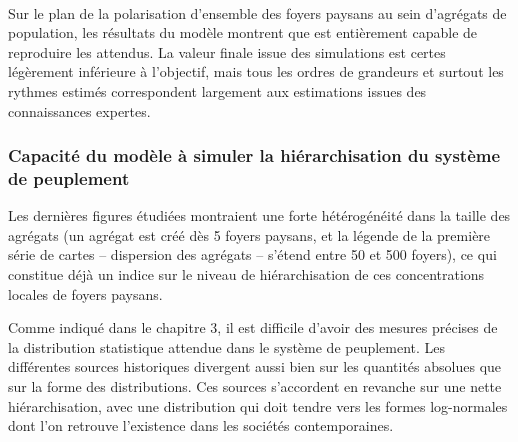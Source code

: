 \bigskip
\paragraph[Conclusion intermédiaire]{}
Sur le plan de la polarisation d'ensemble des foyers paysans au sein d'agrégats de population, les résultats du modèle montrent que \simfeodal{} est entièrement capable de reproduire les attendus.
La valeur finale issue des simulations est certes légèrement inférieure à l'objectif, mais tous les ordres de grandeurs et surtout les rythmes estimés correspondent largement aux estimations issues des connaissances expertes.

\subsubsection{Capacité du modèle à simuler la hiérarchisation du système de peuplement}

Les dernières figures étudiées montraient une forte hétérogénéité dans la taille des agrégats (un agrégat est créé dès 5 foyers paysans, et la légende de la première série de cartes -- dispersion des agrégats -- s'étend entre 50 et 500 foyers), ce qui constitue déjà un indice sur le niveau de hiérarchisation de ces concentrations locales de foyers paysans.

Comme indiqué dans le chapitre 3, il est difficile d'avoir des mesures précises de la distribution statistique attendue dans le système de peuplement.
Les différentes sources historiques divergent aussi bien sur les quantités absolues que sur la forme des distributions.
Ces sources s'accordent en revanche sur une nette hiérarchisation, avec une distribution qui doit tendre vers les formes log-normales dont l'on retrouve l'existence dans les sociétés contemporaines.


